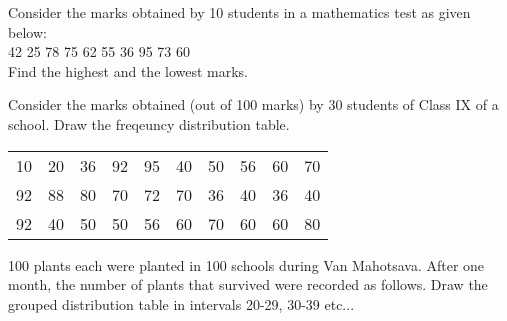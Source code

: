 \item Consider the marks obtained by 10 students in a mathematics test as given below:\\
42 25 78 75 62 55 36 95 73 60\\
Find the highest and the lowest marks.
\item Consider the marks obtained (out of 100 marks) by 30 students of Class IX of a school.  Draw the freqeuncy distribution table.

\begin{tabular}{cccccccccc}
10 &20 &36 &92 &95 &40 &50 &56 &60 &70\\
92 &88 &80 &70 &72 &70 &36 &40 &36 &40\\
92 &40 &50 &50 &56 &60 &70 &60 &60 &80\\
\end{tabular}

\item 100 plants each were planted in 100 schools during Van Mahotsava. After one month, the number of plants that survived were recorded as follows.  Draw the grouped distribution table in intervals 20-29, 30-39 etc...

